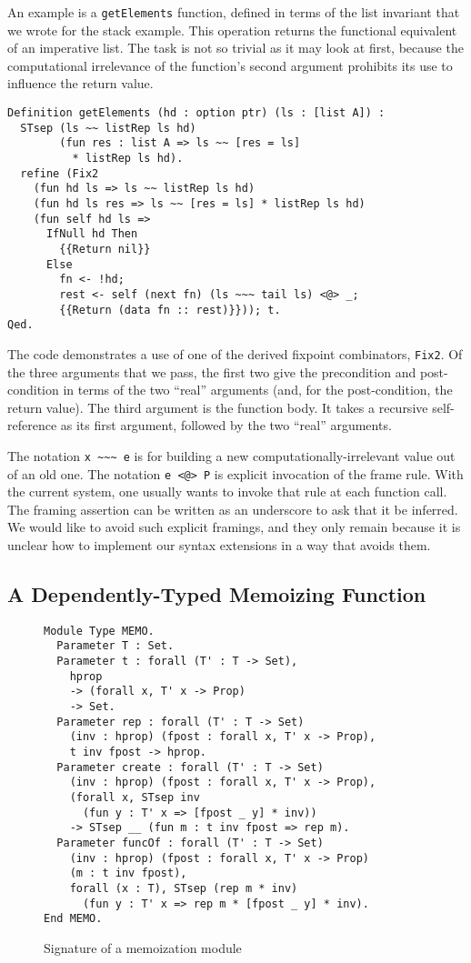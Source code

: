 \documentclass[preprint,nocopyrightspace]{sigplanconf}
\newcommand{\cd}[1]{\texttt{#1}}
\begin{document}
An example is a \cd{getElements} function, defined in terms of the list invariant that we wrote for the stack example.  This operation returns the functional equivalent of an imperative list.  The task is not so trivial as it may look at first, because the computational irrelevance of the function's second argument prohibits its use to influence the return value.

\begin{verbatim}
Definition getElements (hd : option ptr) (ls : [list A]) :
  STsep (ls ~~ listRep ls hd)
        (fun res : list A => ls ~~ [res = ls]
          * listRep ls hd).
  refine (Fix2
    (fun hd ls => ls ~~ listRep ls hd)
    (fun hd ls res => ls ~~ [res = ls] * listRep ls hd)
    (fun self hd ls => 
      IfNull hd Then
        {{Return nil}}
      Else
        fn <- !hd;
        rest <- self (next fn) (ls ~~~ tail ls) <@> _;
        {{Return (data fn :: rest)}})); t.
Qed.
\end{verbatim}

The code demonstrates a use of one of the derived fixpoint combinators, \cd{Fix2}.  Of the three arguments that we pass, the first two give the precondition and post-condition in terms of the two ``real'' arguments (and, for the post-condition, the return value).  The third argument is the function body.  It takes a recursive self-reference as its first argument, followed by the two ``real'' arguments.

The notation \cd{x \textasciitilde\textasciitilde\textasciitilde \; e} is for building a new computationally-irrelevant value out of an old one.  The notation \cd{e <@> P} is explicit invocation of the frame rule.  With the current system, one usually wants to invoke that rule at each function call.  The framing assertion can be written as an underscore to ask that it be inferred.  We would like to avoid such explicit framings, and they only remain because it is unclear how to implement our syntax extensions in a way that avoids them.


\subsection{A Dependently-Typed Memoizing Function}

\begin{figure}
  \begin{verbatim}
Module Type MEMO.
  Parameter T : Set.
  Parameter t : forall (T' : T -> Set),
    hprop
    -> (forall x, T' x -> Prop)
    -> Set.
  Parameter rep : forall (T' : T -> Set)
    (inv : hprop) (fpost : forall x, T' x -> Prop),
    t inv fpost -> hprop.
  Parameter create : forall (T' : T -> Set)
    (inv : hprop) (fpost : forall x, T' x -> Prop),
    (forall x, STsep inv
      (fun y : T' x => [fpost _ y] * inv))
    -> STsep __ (fun m : t inv fpost => rep m).
  Parameter funcOf : forall (T' : T -> Set)
    (inv : hprop) (fpost : forall x, T' x -> Prop)
    (m : t inv fpost),
    forall (x : T), STsep (rep m * inv)
      (fun y : T' x => rep m * [fpost _ y] * inv).
End MEMO.
  \end{verbatim}
  \caption{\label{memoize}Signature of a memoization module}
\end{figure}
\end{document}
